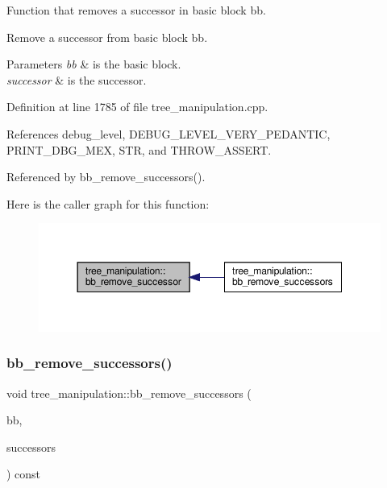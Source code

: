 Function that removes a successor in basic block bb. 

Remove a successor from basic block bb.


\begin{DoxyParams}{Parameters}
{\em bb} & is the basic block. \\
\hline
{\em successor} & is the successor. \\
\hline
\end{DoxyParams}


Definition at line 1785 of file tree\+\_\+manipulation.\+cpp.



References debug\+\_\+level, D\+E\+B\+U\+G\+\_\+\+L\+E\+V\+E\+L\+\_\+\+V\+E\+R\+Y\+\_\+\+P\+E\+D\+A\+N\+T\+IC, P\+R\+I\+N\+T\+\_\+\+D\+B\+G\+\_\+\+M\+EX, S\+TR, and T\+H\+R\+O\+W\+\_\+\+A\+S\+S\+E\+RT.



Referenced by bb\+\_\+remove\+\_\+successors().

Here is the caller graph for this function\+:
\nopagebreak
\begin{figure}[H]
\begin{center}
\leavevmode
\includegraphics[width=350pt]{d0/d99/classtree__manipulation_a08e3efb88fb38b6274efd03c070ac9b4_icgraph}
\end{center}
\end{figure}
\mbox{\label{classtree__manipulation_a2d4bd5bfcf97b6d1bafb832d3174c31b}} 
\subsubsection{\texorpdfstring{bb\+\_\+remove\+\_\+successors()}{bb\_remove\_successors()}}
{\footnotesize\ttfamily void tree\+\_\+manipulation\+::bb\+\_\+remove\+\_\+successors (\begin{DoxyParamCaption}\item[{bloc\+Ref \&}]{bb,  }\item[{const std\+::vector$<$ unsigned int $>$ \&}]{successors }\end{DoxyParamCaption}) const}



